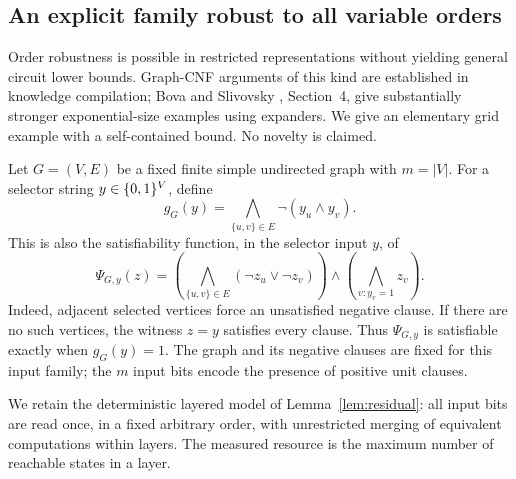 \subsection{An explicit family robust to all variable orders}
Order robustness is possible in restricted representations without yielding
general circuit lower bounds. Graph-CNF arguments of this kind are established
in knowledge compilation; Bova and Slivovsky
\cite{BovaSlivovsky2017}, Section~4, give substantially stronger
exponential-size examples using expanders. We give an elementary grid example
with a self-contained bound. No novelty is claimed.

Let \(G=(V,E)\) be a fixed finite simple undirected graph with \(m=|V|\).
For a selector string \(y\in\{0,1\}^V\), define
\[
 g_G(y)=\bigwedge_{\{u,v\}\in E}\neg(y_u\land y_v).
\]
This is also the satisfiability function, in the selector input \(y\), of
\[
 \Psi_{G,y}(z)=
 \left(\bigwedge_{\{u,v\}\in E}(\neg z_u\lor\neg z_v)\right)
 \land\left(\bigwedge_{v:y_v=1}z_v\right).
\]
Indeed, adjacent selected vertices force an unsatisfied negative clause.
If there are no such vertices, the witness \(z=y\) satisfies every clause.
Thus \(\Psi_{G,y}\) is satisfiable exactly when \(g_G(y)=1\).
The graph and its negative clauses are fixed for this input family; the
\(m\) input bits encode the presence of positive unit clauses.

We retain the deterministic layered model of Lemma~\ref{lem:residual}:
all input bits are read once, in a fixed arbitrary order, with unrestricted
merging of equivalent computations within layers. The measured resource is
the maximum number of reachable states in a layer.

